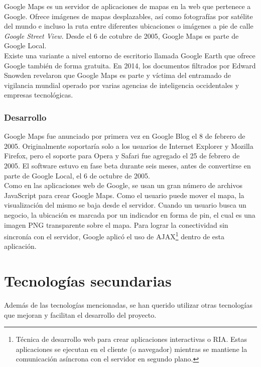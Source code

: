 Google Maps es un servidor de aplicaciones de mapas en la web que pertenece a Google. Ofrece im\'agenes de mapas desplazables, as\'i como fotograf\'ias por sat\'elite del mundo e incluso la ruta entre diferentes ubicaciones o im\'agenes a pie de calle \textit{Google Street View}. Desde el 6 de cotubre de 2005, Google Maps es parte de Google Local.\\

Existe una variante a nivel entorno de escritorio llamada Google Earth que ofrece Google tambi\'en de forma gratuita. En 2014, los documentos filtrados por Edward Snowden revelaron que Google Maps es parte y v\'ictima del entramado de vigilancia mundial operado por varias agencias de inteligencia occidentales y empresas tecnol\'ogicas.\\

\subsubsection{Desarrollo}
Google Maps fue anunciado por primera vez en Google Blog el 8 de febrero de 2005. Originalmente soportar\'ia solo a los usuarios de Internet Explorer y Mozilla Firefox, pero el soporte para Opera y Safari fue agregado el 25 de febrero de 2005. El software estuvo en fase beta durante seis meses, antes de convertirse en parte de Google Local, el 6 de octubre de 2005.\\

Como en las aplicaciones web de Google, se usan un gran n\'umero de archivos JavaScript para crear Google Maps. Como el usuario puede mover el mapa, la visualizaci\'on del mismo se baja desde el servidor. Cuando un usuario busca un negocio, la ubicaci\'on es marcada por un indicador en forma de pin, el cual es una imagen PNG transparente sobre el mapa. Para lograr la conectividad sin sincron\'ia con el servidor, Google aplic\'o el uso de AJAX\footnote[1]{T\'ecnica de desarrollo web para crear aplicaciones interactivas o RIA. Estas aplicaciones se ejecutan en el cliente (o navegador) mientras se mantiene la comunicaci\'on as\'incrona con el servidor en segundo plano.} dentro de esta aplicaci\'on.\\


\section{Tecnolog\'ias secundarias}\label{SEC:Seccion5}
Adem\'as de las tecnolog\'ias mencionadas, se han querido utilizar otras tecnolog\'ias que mejoran y facilitan el desarrollo del proyecto.\\

